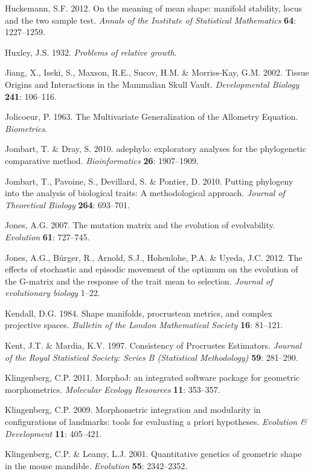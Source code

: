 \documentclass[12pt,twoside]{report}
\begin{document}
Huckemann, S.F. 2012. On the meaning of mean shape: manifold stability,
locus and the two sample test. \emph{Annals of the Institute of
Statistical Mathematics} \textbf{64}: 1227--1259.

Huxley, J.S. 1932. \emph{Problems of relative growth}.

Jiang, X., Iseki, S., Maxson, R.E., Sucov, H.M. \& Morriss-Kay, G.M.
2002. Tissue Origins and Interactions in the Mammalian Skull Vault.
\emph{Developmental Biology} \textbf{241}: 106--116.

Jolicoeur, P. 1963. The Multivariate Generalization of the Allometry
Equation. \emph{Biometrics}.

Jombart, T. \& Dray, S. 2010. adephylo: exploratory analyses for the
phylogenetic comparative method. \emph{Bioinformatics} \textbf{26}:
1907--1909.

Jombart, T., Pavoine, S., Devillard, S. \& Pontier, D. 2010. Putting
phylogeny into the analysis of biological traits: A methodological
approach. \emph{Journal of Theoretical Biology} \textbf{264}: 693--701.

Jones, A.G. 2007. The mutation matrix and the evolution of evolvability.
\emph{Evolution} \textbf{61}: 727--745.

Jones, A.G., Bürger, R., Arnold, S.J., Hohenlohe, P.A. \& Uyeda, J.C.
2012. The effects of stochastic and episodic movement of the optimum on
the evolution of the G-matrix and the response of the trait mean to
selection. \emph{Journal of evolutionary biology} 1--22.

Kendall, D.G. 1984. Shape manifolds, procrustean metrics, and complex
projective spaces. \emph{Bulletin of the London Mathematical Society}
\textbf{16}: 81--121.

Kent, J.T. \& Mardia, K.V. 1997. Consistency of Procrustes Estimators.
\emph{Journal of the Royal Statistical Society: Series B (Statistical
Methodology)} \textbf{59}: 281--290.

Klingenberg, C.P. 2011. MorphoJ: an integrated software package for
geometric morphometrics. \emph{Molecular Ecology Resources} \textbf{11}:
353--357.

Klingenberg, C.P. 2009. Morphometric integration and modularity in
configurations of landmarks: tools for evaluating a priori hypotheses.
\emph{Evolution \& Development} \textbf{11}: 405--421.

Klingenberg, C.P. \& Leamy, L.J. 2001. Quantitative genetics of
geometric shape in the mouse mandible. \emph{Evolution} \textbf{55}:
2342--2352.
\end{document}
